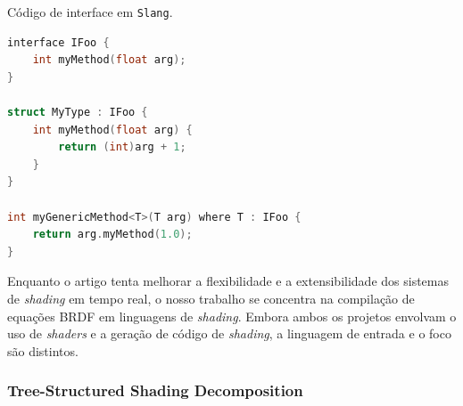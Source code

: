 \begin{codigo}[H]
  \caption{\small Código de interface em \texttt{Slang}. }
  \label{cod-sland}
\begin{lstlisting}[language=C, frame=none, inputencoding=utf8]
interface IFoo {
    int myMethod(float arg);
}

struct MyType : IFoo {
    int myMethod(float arg) {
        return (int)arg + 1;
    }
}

int myGenericMethod<T>(T arg) where T : IFoo {
    return arg.myMethod(1.0);
}
\end{lstlisting}
\end{codigo}

Enquanto o artigo tenta melhorar a flexibilidade e a extensibilidade dos sistemas de \textit{shading} em tempo real, o nosso trabalho se concentra na compilação de equações BRDF em linguagens de \textit{shading}. Embora ambos os projetos envolvam o uso de \textit{shaders} e a geração de código de \textit{shading}, a linguagem de entrada e o foco são distintos.
\subsubsection{Tree-Structured Shading Decomposition}



